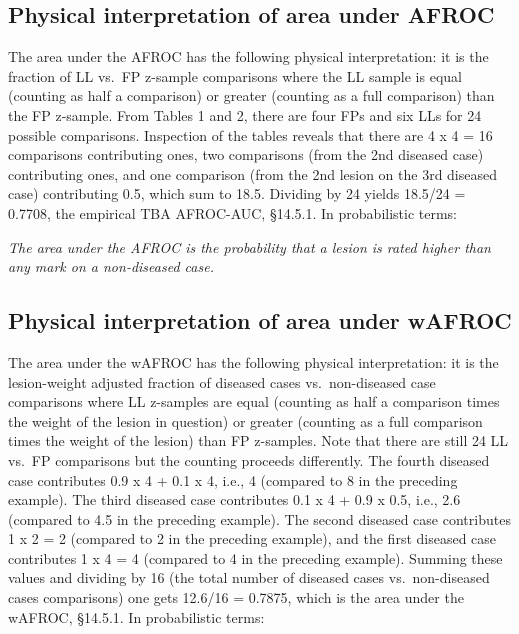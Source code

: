\documentclass[
]{book}
\begin{document}
\hypertarget{physical-interpretation-of-area-under-afroc}{%
\subsection{Physical interpretation of area under AFROC}\label{physical-interpretation-of-area-under-afroc}}

The area under the AFROC has the following physical interpretation: it is the fraction of LL vs.~FP z-sample comparisons where the LL sample is equal (counting as half a comparison) or greater (counting as a full comparison) than the FP z-sample. From Tables 1 and 2, there are four FPs and six LLs for 24 possible comparisons. Inspection of the tables reveals that there are 4 x 4 = 16 comparisons contributing ones, two comparisons (from the 2nd diseased case) contributing ones, and one comparison (from the 2nd lesion on the 3rd diseased case) contributing 0.5, which sum to 18.5. Dividing by 24 yields 18.5/24 = 0.7708, the empirical TBA AFROC-AUC, §14.5.1. In probabilistic terms:

\emph{The area under the AFROC is the probability that a lesion is rated higher than any mark on a non-diseased case.}

\hypertarget{physical-interpretation-of-area-under-wafroc}{%
\subsection{Physical interpretation of area under wAFROC}\label{physical-interpretation-of-area-under-wafroc}}

The area under the wAFROC has the following physical interpretation: it is the lesion-weight adjusted fraction of diseased cases vs.~non-diseased case comparisons where LL z-samples are equal (counting as half a comparison times the weight of the lesion in question) or greater (counting as a full comparison times the weight of the lesion) than FP z-samples. Note that there are still 24 LL vs.~FP comparisons but the counting proceeds differently. The fourth diseased case contributes 0.9 x 4 + 0.1 x 4, i.e., 4 (compared to 8 in the preceding example). The third diseased case contributes 0.1 x 4 + 0.9 x 0.5, i.e., 2.6 (compared to 4.5 in the preceding example). The second diseased case contributes 1 x 2 = 2 (compared to 2 in the preceding example), and the first diseased case contributes 1 x 4 = 4 (compared to 4 in the preceding example). Summing these values and dividing by 16 (the total number of diseased cases vs.~non-diseased cases comparisons) one gets 12.6/16 = 0.7875, which is the area under the wAFROC, §14.5.1. In probabilistic terms:
\end{document}
